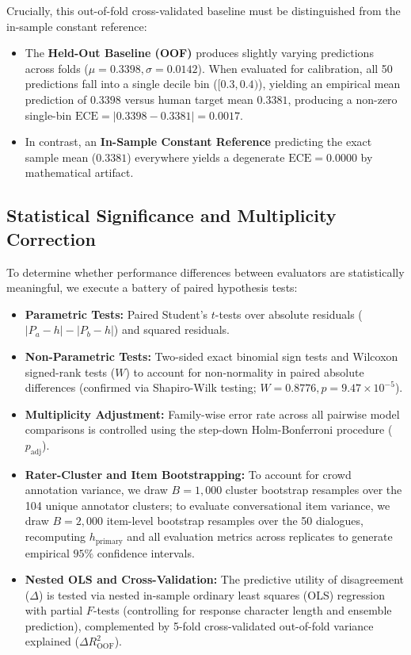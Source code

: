 Crucially, this out-of-fold cross-validated baseline must be distinguished from the in-sample constant reference:
\begin{itemize}
    \item The \textbf{Held-Out Baseline (OOF)} produces slightly varying predictions across folds ($\mu = 0.3398, \sigma = 0.0142$). When evaluated for calibration, all 50 predictions fall into a single decile bin ($[0.3, 0.4)$), yielding an empirical mean prediction of $0.3398$ versus human target mean $0.3381$, producing a non-zero single-bin $\text{ECE} = |0.3398 - 0.3381| = 0.0017$.
    \item In contrast, an \textbf{In-Sample Constant Reference} predicting the exact sample mean ($0.3381$) everywhere yields a degenerate $\text{ECE} = 0.0000$ by mathematical artifact.
\end{itemize}

\subsection{Statistical Significance and Multiplicity Correction}
\label{sec:statistical_testing}

To determine whether performance differences between evaluators are statistically meaningful, we execute a battery of paired hypothesis tests:
\begin{itemize}
    \item \textbf{Parametric Tests:} Paired Student's $t$-tests over absolute residuals ($|P_a - h| - |P_b - h|$) and squared residuals.
    \item \textbf{Non-Parametric Tests:} Two-sided exact binomial sign tests and Wilcoxon signed-rank tests ($W$) to account for non-normality in paired absolute differences (confirmed via Shapiro-Wilk testing; $W = 0.8776, p = 9.47 \times 10^{-5}$).
    \item \textbf{Multiplicity Adjustment:} Family-wise error rate across all pairwise model comparisons is controlled using the step-down Holm-Bonferroni procedure ($p_{\text{adj}}$).
    \item \textbf{Rater-Cluster and Item Bootstrapping:} To account for crowd annotation variance, we draw $B = 1,000$ cluster bootstrap resamples over the 104 unique annotator clusters; to evaluate conversational item variance, we draw $B = 2,000$ item-level bootstrap resamples over the 50 dialogues, recomputing $h_{\text{primary}}$ and all evaluation metrics across replicates to generate empirical $95\%$ confidence intervals.
    \item \textbf{Nested OLS and Cross-Validation:} The predictive utility of disagreement ($\Delta$) is tested via nested in-sample ordinary least squares (OLS) regression with partial $F$-tests (controlling for response character length and ensemble prediction), complemented by 5-fold cross-validated out-of-fold variance explained ($\Delta R^2_{\text{OOF}}$).
\end{itemize}
